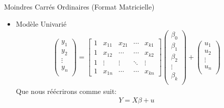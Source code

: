 \documentclass{beamer}
\begin{document}
\begin{frame}{Moindres Carrés Ordinaires (Format Matricielle)}
\begin{itemize}
\item Modèle Univarié 
\begin{align*}
\begin{pmatrix}
y_1\\ 
y_2\\ 
\vdots\\
y_n\\
\end{pmatrix}=\begin{bmatrix}
 1&x_{11}  &x_{21}  &\cdots   &x_{k1} \\ 
 1&x_{12}  &\cdots  & \cdots &x_{k2} \\ 
 1& \vdots  & \vdots  & \ddots  & \vdots\\ 
 1&x_{1n}  & \cdots & \cdots &x_{kn}
\end{bmatrix} \begin{pmatrix}
\beta_0\\ 
\beta_1\\ 
\beta_2\\ 
\vdots\\
\beta_k\\
\end{pmatrix}+\begin{pmatrix}
u_1\\ 
u_2\\ 
\vdots\\
u_n\\
\end{pmatrix}
\end{align*}
Que nous réécrirons comme suit: 
\begin{align*}
Y=X \beta + u 
\end{align*}
\end{itemize}
\end{frame}
\end{document}
